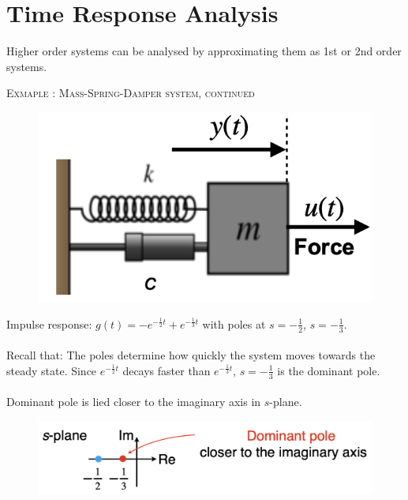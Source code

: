 \documentclass[12pt,a4paper]{article}
\begin{document}
\section{Time Response Analysis}
Higher order systems can be analysed by approximating them as 1st or 2nd order systems. \\
\begin{tcolorbox}[breakable]
\textsc{Exmaple : Mass-Spring-Damper system, continued}
\begin{figure}[H] \centering
\includegraphics[width=.3\textwidth]{images/MSD_system.png}
\end{figure}
Impulse response: $g(t) = -e^{-\frac{1}{2}t}+ e^{-\frac{1}{3}t}$ with poles at $s=-\frac{1}{2}$, $s=-\frac{1}{3}$.\\\\
Recall that: The poles determine how quickly the system moves towards the steady state. Since $e^{-\frac{1}{2}t}$ decays faster than $e^{-\frac{1}{3}t}$, $s=-\frac{1}{3}$ is the dominant pole.\\\\
Dominant pole is lied closer to the imaginary axis in $s$-plane.
\begin{figure}[H] \centering 
\includegraphics[width=.6\textwidth]{images/4ex1.png}
\end{figure}
\end{tcolorbox}
\end{document}
